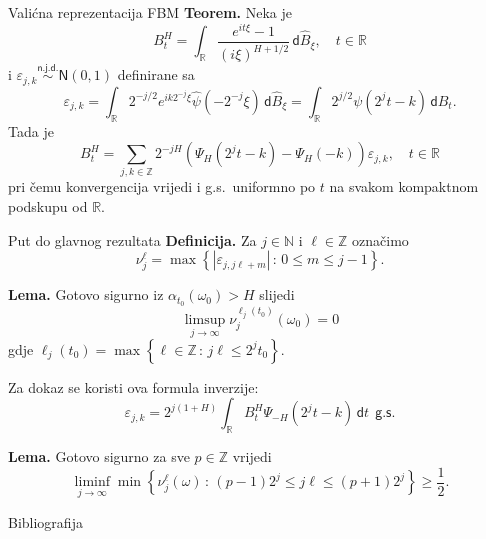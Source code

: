 \documentclass{beamer}
\renewcommand{\mathrm}[1]{\mathsf{#1}}
\newcommand{\ub}{\rightarrow \infty}
\newcommand{\st}{\, \colon \,}
\newcommand{\D}{\,\mathrm d}
\newcommand{\wh}[1]{\widehat{#1}}
\newcommand{\R}{\mathbb{R}}
\newcommand{\N}{\mathbb{N}}
\newcommand{\Z}{\mathbb{Z}}
\newcommand{\mathgs}{\ \ \mathrm{g.s.}}
\newcommand{\abs}[1]{\left| {#1} \right|}
\begin{document}
\begin{frame}{Valićna reprezentacija FBM}
\textbf{Teorem.} Neka je 
\begin{equation}
B_t^H = \int_\R \frac{e^{it\xi}-1}{(i\xi)^{H+1/2}} \D \wh B_\xi, \quad t \in \R
\end{equation}
i \( \varepsilon_{j,k} \stackrel{\mathrm{n.j.d.}}{\sim} \mathrm N(0,1) \) definirane sa
\begin{equation}
\varepsilon_{j,k} =
		\int_\R 2^{-j/2}e^{ik2^{-j}\xi}\wh \psi(-2^{-j}\xi)\D \wh B_\xi =
		\int_\R 2^{j/2} \psi(2^jt-k) \D B_t.
\end{equation}
Tada je 
	\begin{equation}\label{eq:valfbmrep}
		B^H_t = \sum_{j,k \in \Z}
		2^{-jH} \left( \Psi_H(2^jt - k) - \Psi_H(-k)  \right) \varepsilon_{j,k}, \quad t \in \R
	\end{equation}
    pri čemu konvergencija vrijedi i g.s.\ uniformno po \( t \) na svakom
	kompaktnom podskupu od \( \R \).
\end{frame}

\begin{frame}[allowframebreaks]{Put do glavnog rezultata}
\textbf{Definicija.} Za \( j \in \N \) i \( \ell \in \Z \) označimo
\begin{equation}
\nu_j^\ell = \max \left\{ \abs{\varepsilon_{j,j\ell+m}} \st 0 \le m \le j-1 \right\}.
\end{equation}

\vskip10pt
\textbf{Lema.} Gotovo sigurno iz \( \alpha_{t_0}(\omega_0) > H \) slijedi
\begin{equation}
\limsup\limits_{j \ub} \nu_j^{\ell_j(t_0)}(\omega_0) = 0
\end{equation}
gdje \( \ell_j(t_0) = \max\left\{ \ell \in \Z \st j\ell \le 2^jt_0 \right\} \).

\vskip10pt
Za dokaz se koristi ova formula inverzije:
	\begin{equation}
		\varepsilon_{j,k} = 2^{j(1+H)}\int_\R B^H_t\Psi_{-H}(2^jt-k) \D t \mathgs
	\end{equation}

\framebreak
\textbf{Lema.} Gotovo sigurno za sve \( p \in \Z \) vrijedi
\begin{equation}
\liminf\limits_{j \ub} \min \left\{ \nu_j^\ell(\omega) \st
		(p-1)2^j \le j\ell \le (p+1)2^j \right\} \ge \frac 12.
\end{equation}
\end{frame}


\begin{frame}[t, allowframebreaks]{Bibliografija}
	\printbibliography
\end{frame}
\end{document}
